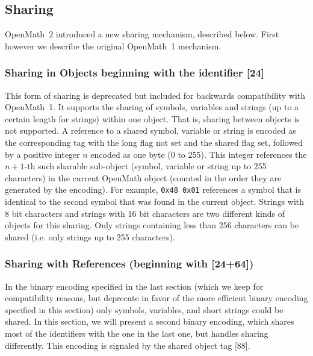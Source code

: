 \documentclass{report}
\def\OM{OpenMath\xspace}
\begin{document}
\subsection{Sharing}\label{sec_both_sharing}
  
  
\OM~2 introduced a new sharing mechanism, described below.  First however we describe the
original \OM~1 mechanism.
  
\subsubsection{Sharing in Objects beginning with the identifier [24]}\label{sec_sharing}
    
This form of sharing is deprecated but included for backwards compatibility with \OM~1.
It supports the sharing of symbols, variables and strings (up to a certain length for
strings) within one object. That is, sharing between objects is not supported.  A
reference to a shared symbol, variable or string is encoded as the corresponding tag with
the long flag not set and the shared flag set, followed by a positive integer $n$ encoded
as one byte (0 to 255). This integer references the $n+1$-th such sharable sub-object
(symbol, variable or string up to 255 characters) in the current \OM object (counted in
the order they are generated by the encoding).  For example, \lstinline|0x48 0x01|
references a symbol that is identical to the second symbol that was found in the current
object.  Strings with 8 bit characters and strings with 16 bit characters are two
different kinds of objects for this sharing. Only strings containing less than 256
characters can be shared (i.e. only strings up to 255 characters).

  
  
  \subsubsection{Sharing with References (beginning with [24+64])}\label{sec_sharing_references}
    
  In the binary encoding specified in the last section (which we keep for compatibility
  reasons, but deprecate in favor of the more efficient binary encoding specified in this
  section) only symbols, variables, and short strings could be shared. In this section, we
  will present a second binary encoding, which shares most of the identifiers with the one
  in the last one, but handles sharing differently. This encoding is signaled by the
  shared object tag [88].
\end{document}
